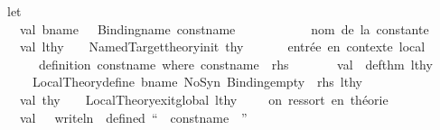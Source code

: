 \begin{isabellebody}
\ \ let\isanewline
\ \ \ \ val\ bname\ \ {\isacharequal}{\kern0pt}\ Binding{\isachardot}{\kern0pt}name\ const{\isacharunderscore}{\kern0pt}name\ \ \ \ \ \ \ \ \ \ \ {\isacharparenleft}{\kern0pt}{\isacharasterisk}{\kern0pt}\ nom\ de\ la\ constante\ {\isacharasterisk}{\kern0pt}{\isacharparenright}{\kern0pt}\isanewline
\ \ \ \ val\ lthy\ \ \ {\isacharequal}{\kern0pt}\ Named{\isacharunderscore}{\kern0pt}Target{\isachardot}{\kern0pt}theory{\isacharunderscore}{\kern0pt}init\ thy\ \ \ \ \ \ {\isacharparenleft}{\kern0pt}{\isacharasterisk}{\kern0pt}\ entrée\ en\ contexte\ local\ {\isacharasterisk}{\kern0pt}{\isacharparenright}{\kern0pt}\isanewline
\isanewline
\ \ \ \ {\isacharparenleft}{\kern0pt}{\isacharasterisk}{\kern0pt}\ \ \ definition\ const{\isacharunderscore}{\kern0pt}name\ where\ {\isachardoublequote}{\kern0pt}const{\isacharunderscore}{\kern0pt}name\ {\isacharequal}{\kern0pt}\ rhs{\isachardoublequote}{\kern0pt}\ \ \ {\isacharasterisk}{\kern0pt}{\isacharparenright}{\kern0pt}\isanewline
\ \ \ \ val\ {\isacharparenleft}{\kern0pt}{\isacharparenleft}{\kern0pt}{\isacharunderscore}{\kern0pt}{\isacharcomma}{\kern0pt}\ def{\isacharunderscore}{\kern0pt}thm{\isacharparenright}{\kern0pt}{\isacharcomma}{\kern0pt}\ lthy{\isacharprime}{\kern0pt}{\isacharparenright}{\kern0pt}\ {\isacharequal}{\kern0pt}\isanewline
\ \ \ \ \ \ Local{\isacharunderscore}{\kern0pt}Theory{\isachardot}{\kern0pt}define\ {\isacharparenleft}{\kern0pt}{\isacharparenleft}{\kern0pt}bname{\isacharcomma}{\kern0pt}\ NoSyn{\isacharparenright}{\kern0pt}{\isacharcomma}{\kern0pt}\ {\isacharparenleft}{\kern0pt}{\isacharparenleft}{\kern0pt}Binding{\isachardot}{\kern0pt}empty{\isacharcomma}{\kern0pt}\ {\isacharbrackleft}{\kern0pt}{\isacharbrackright}{\kern0pt}{\isacharparenright}{\kern0pt}{\isacharcomma}{\kern0pt}\ rhs{\isacharparenright}{\kern0pt}{\isacharparenright}{\kern0pt}\ lthy\isanewline
\isanewline
\ \ \ \ val\ thy{\isacharprime}{\kern0pt}\ \ \ {\isacharequal}{\kern0pt}\ Local{\isacharunderscore}{\kern0pt}Theory{\isachardot}{\kern0pt}exit{\isacharunderscore}{\kern0pt}global\ lthy{\isacharprime}{\kern0pt}\ \ \ \ {\isacharparenleft}{\kern0pt}{\isacharasterisk}{\kern0pt}\ on\ ressort\ en\ théorie\ {\isacharasterisk}{\kern0pt}{\isacharparenright}{\kern0pt}\isanewline
\isanewline
\ \ \ \ val\ {\isacharunderscore}{\kern0pt}\ {\isacharequal}{\kern0pt}\ writeln\ {\isacharparenleft}{\kern0pt}{\isachardoublequote}{\kern0pt}{\isasymcheckmark}\ defined\ “{\isachardoublequote}{\kern0pt}\ {\isacharcircum}{\kern0pt}\ const{\isacharunderscore}{\kern0pt}name\ {\isacharcircum}{\kern0pt}\ {\isachardoublequote}{\kern0pt}”\ {\isacharcolon}{\kern0pt}\ {\isachardoublequote}{\kern0pt}\ {\isacharcircum}{\kern0pt}\isanewline

\end{isabellebody}
